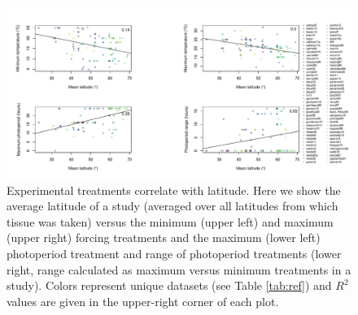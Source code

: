 \documentclass[11pt]{article}
\begin{document}
\begin{figure}[t!]
\centering
\includegraphics[width=1\textwidth]{..//..//analyses/limitingcues/figures/supplatplots4panel.pdf}
\caption{Experimental treatments correlate with latitude. Here we show the average latitude of a study (averaged over all latitudes from which tissue was taken) versus the minimum (upper left) and maximum (upper right) forcing treatments and the maximum (lower left) photoperiod treatment and range of photoperiod treatments (lower right, range calculated as maximum versus minimum treatments in a study). Colors represent unique datasets (see Table \ref{tab:ref}) and $R^2$ values are given in the upper-right corner of each plot.}
  \label{fig:lat}
\end{figure}
\end{document}
